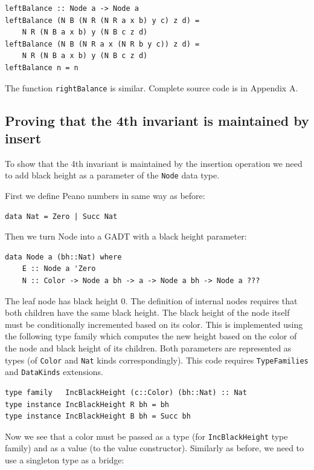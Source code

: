 \documentclass{tmr}
\begin{document}
\begin{Verbatim}
leftBalance :: Node a -> Node a
leftBalance (N B (N R (N R a x b) y c) z d) =
    N R (N B a x b) y (N B c z d)
leftBalance (N B (N R a x (N R b y c)) z d) =
    N R (N B a x b) y (N B c z d)
leftBalance n = n
\end{Verbatim}

The function \verb|rightBalance| is similar. Complete source code is in Appendix A.

\subsection{Proving that the 4th invariant is maintained by insert}

To show that the 4th invariant is maintained by the insertion operation we need to add black height as a parameter of the \verb|Node| data type.

First we define Peano numbers in same way as before:

\begin{Verbatim}
data Nat = Zero | Succ Nat
\end{Verbatim}

Then we turn Node into a GADT with a black height parameter:

\begin{Verbatim}
data Node a (bh::Nat) where
    E :: Node a 'Zero
    N :: Color -> Node a bh -> a -> Node a bh -> Node a ???
\end{Verbatim}

The leaf node has black height $0$. The definition of internal nodes requires that both children have the same black height. The black height of the node itself must be conditionally incremented based on its color. This is implemented using the following type family which computes the new height based on the color of the node and black height of its children. Both parameters are represented as types (of \verb|Color| and \verb|Nat| kinds correspondingly). This code requires \verb|TypeFamilies| and \verb|DataKinds| extensions.

\begin{Verbatim}
type family   IncBlackHeight (c::Color) (bh::Nat) :: Nat
type instance IncBlackHeight R bh = bh
type instance IncBlackHeight B bh = Succ bh
\end{Verbatim}

Now we see that a color must be passed as a type (for \verb|IncBlackHeight| type family) and as a value (to the value constructor). Similarly as before, we need to use a singleton type as a bridge:
\end{document}

